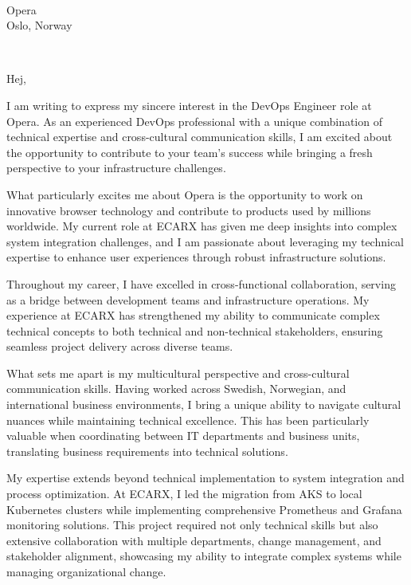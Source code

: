 \documentclass[a4paper,10pt]{article}
\begin{document}
\pagestyle{empty} %

\begin{letter}{\color{darkblue}\\
Opera\\
Oslo, Norway}

\\
\vspace{40pt}

\opening{Hej,}

\vspace{10pt}

I am writing to express my sincere interest in the DevOps Engineer role at Opera. As an experienced DevOps professional with a unique combination of technical expertise and cross-cultural communication skills, I am excited about the opportunity to contribute to your team's success while bringing a fresh perspective to your infrastructure challenges.

What particularly excites me about Opera is the opportunity to work on innovative browser technology and contribute to products used by millions worldwide. My current role at ECARX has given me deep insights into complex system integration challenges, and I am passionate about leveraging my technical expertise to enhance user experiences through robust infrastructure solutions.

Throughout my career, I have excelled in cross-functional collaboration, serving as a bridge between development teams and infrastructure operations. My experience at ECARX has strengthened my ability to communicate complex technical concepts to both technical and non-technical stakeholders, ensuring seamless project delivery across diverse teams.

What sets me apart is my multicultural perspective and cross-cultural communication skills. Having worked across Swedish, Norwegian, and international business environments, I bring a unique ability to navigate cultural nuances while maintaining technical excellence. This has been particularly valuable when coordinating between IT departments and business units, translating business requirements into technical solutions.

My expertise extends beyond technical implementation to system integration and process optimization. At ECARX, I led the migration from AKS to local Kubernetes clusters while implementing comprehensive Prometheus and Grafana monitoring solutions. This project required not only technical skills but also extensive collaboration with multiple departments, change management, and stakeholder alignment, showcasing my ability to integrate complex systems while managing organizational change.


\end{letter}
\end{document}
